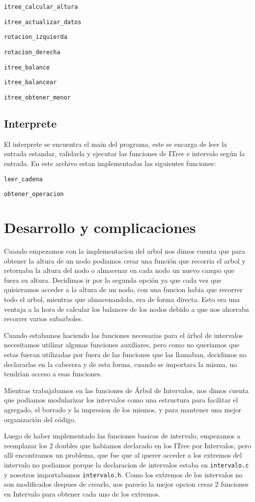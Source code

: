 \documentclass[]{article}
\begin{document}
\verb|itree_calcular_altura|

\verb|itree_actualizar_datos|

\verb|rotacion_izquierda|

\verb|rotacion_derecha|

\verb|itree_balance|

\verb|itree_balancear|

\verb|itree_obtener_menor|

\subsection{Interprete}
El interprete se encuentra el main del programa, este se encarga de leer la entrada estandar, validarla y ejecutar las funciones de ITree e intervalo según la entrada. En este archivo estan implementadas las siguientes funciones:

\verb|leer_cadena|

\verb|obtener_operacion|

\newpage
\section{Desarrollo y complicaciones}
Cuando empezamos con la implementacion del arbol nos dimos cuenta que para obtener la altura de un nodo podiamos crear una función que recorria el arbol y retornaba la altura del nodo o almacenar en cada nodo un nuevo campo que fuera su altura. Decidimos ir por la segunda opción ya que cada vez que quisieramos acceder a la altura de un nodo, con una funcion habia que recorrer todo el arbol, mientras que almacenandola, era de forma directa. Esto era una ventaja a la hora de calcular los balances de los nodos debido a que nos ahorraba recorrer varios subarboles.

Cuando estabamos haciendo las funciones necesarias para el árbol de intervalos necesitamos utilizar algunas funciones auxiliares, pero como no queriamos que estas fueran utilizadas por fuera de las funciones que las llamaban, decidimos no declararlas en la cabecera y de esta forma, cuando se importara la misma, no tendrían acceso a esas funciones.

Mientras trabajabamos en las funciones de Árbol de Intervalos, nos dimos cuenta que podiamos modularizar los intervalos como una estructura para facilitar el agregado, el borrado y la impresion de los mismos, y para mantener una mejor organización del código.

Luego de haber implementado las funciones basicas de intervalo, empezamos a reemplazar los 2 doubles que habiamos declarado en los ITree por Intervalos, pero allí encontramos un problema, que fue que al querer acceder a los extremos del intervalo no podiamos porque la declaracion de intervalos estaba en \verb|intervalo.c| y nosotros importabamos \verb|intervalo.h|. Como los extremos de los intervalos no son modificados despues de crearlo, nos parecio la mejor opcion crear 2 funciones en Intervalo para obtener cada uno de los extremos.
\end{document}
